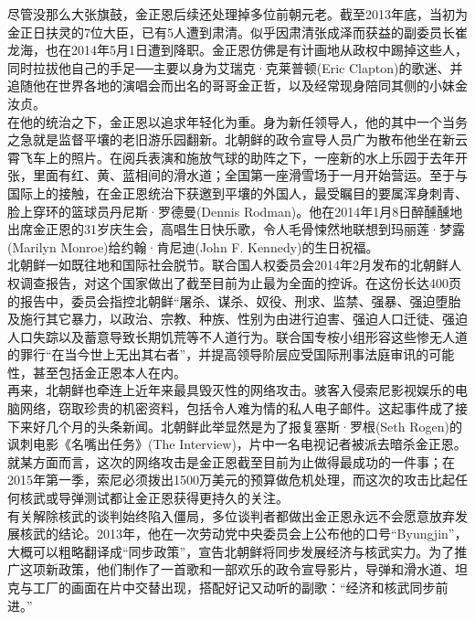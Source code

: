 尽管没那么大张旗鼓，金正恩后续还处理掉多位前朝元老。截至2013年底，当初为金正日扶灵的7位大臣，已有5人遭到肃清。似乎因肃清张成泽而获益的副委员长崔龙海，也在2014年5月1日遭到降职。金正恩仿佛是有计画地从政权中踢掉这些人，同时拉拔他自己的手足──主要以身为艾瑞克·克莱普顿(Eric Clapton)的歌迷、并追随他在世界各地的演唱会而出名的哥哥金正哲，以及经常现身陪同其侧的小妹金汝贞。\\

在他的统治之下，金正恩以追求年轻化为重。身为新任领导人，他的其中一个当务之急就是监督平壤的老旧游乐园翻新。北朝鲜的政令宣导人员广为散布他坐在新云霄飞车上的照片。在阅兵表演和施放气球的助阵之下，一座新的水上乐园于去年开张，里面有红、黄、蓝相间的滑水道；全国第一座滑雪场于一月开始营运。至于与国际上的接触，在金正恩统治下获邀到平壤的外国人，最受瞩目的要属浑身刺青、脸上穿环的篮球员丹尼斯·罗德曼(Dennis Rodman)。他在2014年1月8日醉醺醺地出席金正恩的31岁庆生会，高唱生日快乐歌，令人毛骨悚然地联想到玛丽莲·梦露(Marilyn Monroe)给约翰·肯尼迪(John F. Kennedy)的生日祝福。\\

北朝鲜一如既往地和国际社会脱节。联合国人权委员会2014年2月发布的北朝鲜人权调查报告，对这个国家做出了截至目前为止最为全面的控诉。在这份长达400页的报告中，委员会指控北朝鲜“屠杀、谋杀、奴役、刑求、监禁、强暴、强迫堕胎及施行其它暴力，以政治、宗教、种族、性别为由进行迫害、强迫人口迁徒、强迫人口失踪以及蓄意导致长期饥荒等不人道行为。联合国专桉小组形容这些惨无人道的罪行“在当今世上无出其右者”，并提高领导阶层应受国际刑事法庭审讯的可能性，甚至包括金正恩本人在内。\\

再来，北朝鲜也牵连上近年来最具毁灭性的网络攻击。骇客入侵索尼影视娱乐的电脑网络，窃取珍贵的机密资料，包括令人难为情的私人电子邮件。这起事件成了接下来好几个月的头条新闻。北朝鲜此举显然是为了报复塞斯·罗根(Seth Rogen)的讽刺电影《名嘴出任务》(The Interview)，片中一名电视记者被派去暗杀金正恩。就某方面而言，这次的网络攻击是金正恩截至目前为止做得最成功的一件事；在2015年第一季，索尼必须拨出1500万美元的预算做危机处理，而这次的攻击比起任何核武或导弹测试都让金正恩获得更持久的关注。\\

有关解除核武的谈判始终陷入僵局，多位谈判者都做出金正恩永远不会愿意放弃发展核武的结论。2013年，他在一次劳动党中央委员会上公布他的口号“Byungjin”，大概可以粗略翻译成“同步政策”，宣告北朝鲜将同步发展经济与核武实力。为了推广这项新政策，他们制作了一首歌和一部欢乐的政令宣导影片，导弹和滑水道、坦克与工厂的画面在片中交替出现，搭配好记又动听的副歌：“经济和核武同步前进。”\\

